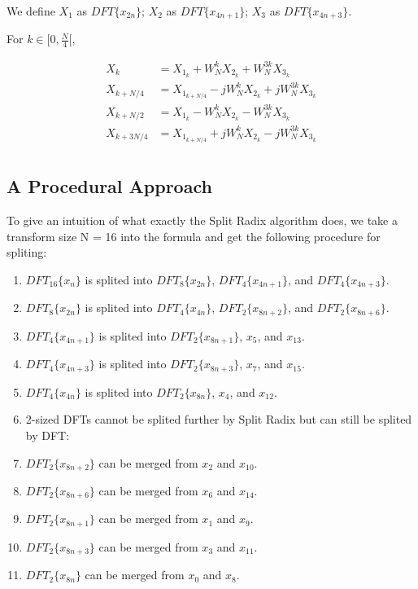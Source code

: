 \documentclass[a4paper]{report}
\begin{document}
	We define $X_1$ as $DFT\{x_{2n}\}$; $X_2$ as $DFT\{x_{4n+1}\}$; $X_3$ as $DFT\{x_{4n+3}\}$.

	\bigskip
	
	For $k \in [0, \frac{N}{4}[$,
	
	\[\begin{split}
  X_k & = X_{1_k} + W_N^k X_{2_k} + W_N^{3k} X_{3_k}\\
  X_{k + N/4} & = X_{1_{k + N/4}} - jW_N^k X_{2_k} + jW_N^{3k} X_{3_k} \\
  X_{k + N/2} & = X_{1_k} - W_N^k X_{2_k} - W_N^{3k} X_{3_k} \\
  X_{k + 3N/4} & = X_{1_{k + N/4}} + jW_N^k X_{2_k} - jW_N^{3k} X_{3_k} \\
	\end{split}\]

\subsection{A Procedural Approach} \indent

	To give an intuition of what exactly the Split Radix algorithm does, we take a transform size N = 16 into the formula and get the following procedure for spliting:
	
	\begin{enumerate}
	\item $DFT_{16}\{x_n\}$ is splited into $DFT_{8}\{x_{2n}\}$, $DFT_{4}\{x_{4n+1}\}$, and $DFT_{4}\{x_{4n+3}\}$.
	\item $DFT_{8}\{x_{2n}\}$ is splited into $DFT_{4}\{x_{4n}\}$, $DFT_{2}\{x_{8n+2}\}$, and $DFT_{2}\{x_{8n+6}\}$.
	\item $DFT_{4}\{x_{4n+1}\}$ is splited into $DFT_{2}\{x_{8n+1}\}$, $x_5$, and $x_{13}$.
	\item $DFT_{4}\{x_{4n+3}\}$ is splited into $DFT_{2}\{x_{8n+3}\}$, $x_7$, and $x_{15}$.
	\item $DFT_{4}\{x_{4n}\}$ is splited into $DFT_{2}\{x_{8n}\}$, $x_4$, and $x_{12}$.
	\item 2-sized DFTs cannot be splited further by Split Radix but can still be splited by DFT:
	\item $DFT_{2}\{x_{8n+2}\}$ can be merged from $x_2$ and $x_{10}$.
	\item $DFT_{2}\{x_{8n+6}\}$ can be merged from $x_6$ and $x_{14}$.
	\item $DFT_{2}\{x_{8n+1}\}$ can be merged from $x_1$ and $x_{9}$.
	\item $DFT_{2}\{x_{8n+3}\}$ can be merged from $x_3$ and $x_{11}$.
	\item $DFT_{2}\{x_{8n}\}$ can be merged from $x_0$ and $x_{8}$.
	\end{enumerate}
	
\end{document}
